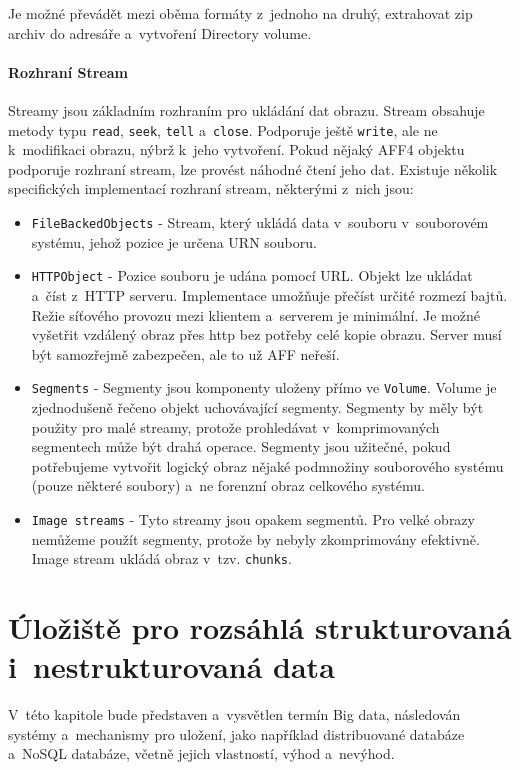 \noindent Je možné převádět mezi oběma formáty z~jednoho na druhý, extrahovat zip archiv do adresáře a~vytvoření Directory volume.

\subsubsection{Rozhraní Stream}
Streamy jsou základním rozhraním pro ukládání dat obrazu. Stream obsahuje metody typu \texttt{read}, \texttt{seek}, \texttt{tell} a~\texttt{close}. Podporuje ještě \texttt{write}, ale ne k~modifikaci obrazu, nýbrž k~jeho vytvoření. Pokud nějaký AFF4 objektu podporuje rozhraní stream, lze provést náhodné čtení jeho dat. Existuje několik specifických implementací rozhraní stream, některými z~nich jsou:

\begin{itemize}
\item \texttt{FileBackedObjects} - Stream, který ukládá data v~souboru v~souborovém systému, jehož pozice je určena URN souboru.

\item \texttt{HTTPObject} - Pozice souboru je udána pomocí URL. Objekt lze ukládat a~číst z~HTTP serveru. Implementace umožňuje přečíst určité rozmezí bajtů. Režie síťového provozu mezi klientem a~serverem je minimální. Je možné vyšetřit vzdálený obraz přes http bez potřeby celé kopie obrazu. Server musí být samozřejmě zabezpečen, ale to už AFF neřeší.

\item \texttt{Segments} - Segmenty jsou komponenty uloženy přímo ve \texttt{Volume}. Volume je zjednodušeně řečeno objekt uchovávající segmenty. Segmenty by měly být použity pro malé streamy, protože prohledávat v~komprimovaných segmentech může být drahá operace. Segmenty jsou užitečné, pokud potřebujeme vytvořit logický obraz nějaké podmnožiny souborového systému (pouze některé soubory) a~ne forenzní obraz celkového systému.

\item \texttt{Image streams} - Tyto streamy jsou opakem segmentů. Pro velké obrazy nemůžeme použít segmenty, protože by nebyly zkomprimovány efektivně. Image stream ukládá obraz v~tzv. \texttt{chunks}.
\end{itemize}

\chapter{Úložiště pro rozsáhlá strukturovaná i~nestrukturovaná data} \label{chapter2}
V~této kapitole bude představen a~vysvětlen termín Big data, následován systémy a~mechanismy pro uložení, jako například distribuované databáze a~NoSQL databáze, včetně jejich vlastností, výhod a~nevýhod.

